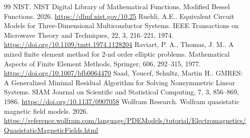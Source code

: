\begin{thebibliography}{99}
 NIST. NIST Digital Library of Mathematical Functions, Modified Bessel Functions. 2026. \url{https://dlmf.nist.gov/10.25}
 Ruehli, A.E.. Equivalent Circuit Models for Three-Dimensional Multiconductor Systems. IEEE Transactions on Microwave Theory and Techniques, 22, 3, 216--221, 1974. \url{https://doi.org/10.1109/tmtt.1974.1128204}
 Raviart, P. A., Thomas, J. M.. A mixed finite element method for 2-nd order elliptic problems. Mathematical Aspects of Finite Element Methods, Springer, 606, 292--315, 1977. \url{https://doi.org/10.1007/bfb0064470}
 Saad, Youcef, Schultz, Martin H.. GMRES: A Generalized Minimal Residual Algorithm for Solving Nonsymmetric Linear Systems. SIAM Journal on Scientific and Statistical Computing, 7, 3, 856--869, 1986. \url{https://doi.org/10.1137/0907058}
 Wolfram Research. Wolfram quasistatic magnetic field models. 2026. \url{https://reference.wolfram.com/language/PDEModels/tutorial/Electromagnetics/QuasistaticMagneticFields.html}
\end{thebibliography}
